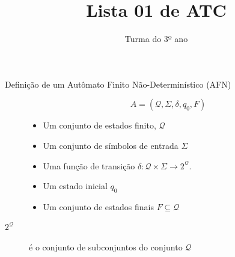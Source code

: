 \documentclass[12pt]{article}
\title{Lista 01 de ATC}
\date{}
\author{Turma do 3º ano}
\def\cQ{\mathcal{Q}}
\begin{document}
 


\maketitle

\begin{description}

\item[Definição de um Autômato Finito Não-Determinístico (AFN)]
\[A = (\cQ, \Sigma, \delta, q_0, F)\]
\begin{itemize}
\item Um conjunto de estados finito, $\cQ$
\item Um conjunto de símbolos de entrada $\Sigma$
\item Uma função de transição $\delta: \cQ\times\Sigma\rightarrow 2^\cQ$.
\item Um estado inicial $q_0$
\item Um conjunto de estados finais $F\subseteq \cQ$
\end{itemize}


\item[$2^\cQ$] é o conjunto de subconjuntos do conjunto $\cQ$


\end{description}


\vspace{3em}


\break
\end{document}
